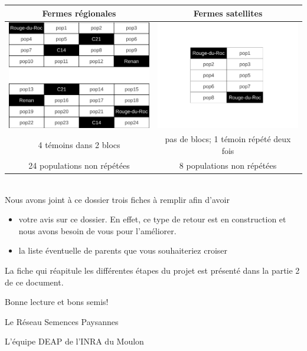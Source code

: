 \begin{center}
	\begin{tabular}{c c}
	
	Fermes régionales & Fermes satellites \\
	\hline	\includegraphics[width=.4\textwidth]{tex_files/plan_FR.pdf} & \includegraphics[width=.4\textwidth]{tex_files/plan_FS_bis.pdf} \\
	
	4 témoins dans 2 blocs & pas de blocs; 1 témoin répété deux fois \\

	24 populations non répétées & 8 populations non répétées \\
	\hline
	\end{tabular}
\end{center}

~\\ 

Nous avons joint à ce dossier trois fiches à remplir afin d'avoir 
\begin{itemize}
\item votre avis sur ce dossier. En effet, ce type de retour est en construction et nous avons besoin de vous pour l'améliorer.
\item la liste éventuelle de parents que vous souhaiteriez croiser
\end{itemize}


La fiche  qui réapitule les différentes étapes du projet est présenté dans la partie 2 de ce document.

\vfill

\begin{flushright}
Bonne lecture et bons semis!

Le Réseau Semences Paysannes

L'équipe DEAP de l'INRA du Moulon
\end{flushright}
\vfill


\newpage

